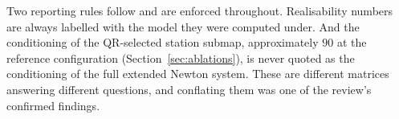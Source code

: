 Two reporting rules follow and are enforced throughout. Realisability numbers
are always labelled with the model they were computed under. And the
conditioning of the QR-selected station submap, approximately $90$ at the
reference configuration (Section~\ref{sec:ablations}), is never quoted as the
conditioning of the full extended Newton system. These are different matrices
answering different questions, and conflating them was one of the review's
confirmed findings.
